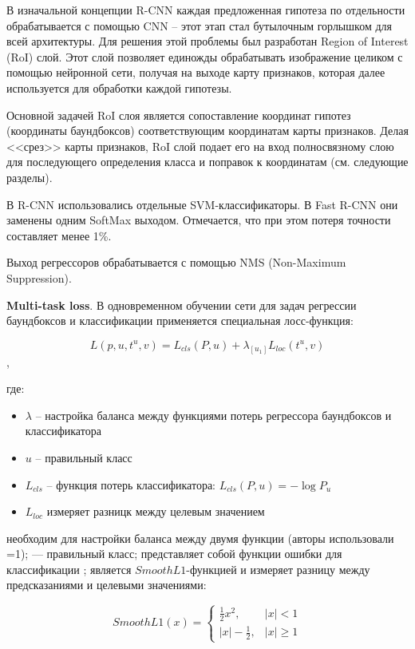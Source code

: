 В изначальной концепции R-CNN каждая предложенная гипотеза по отдельности обрабатывается с помощью CNN -- этот этап стал бутылочным горлышком для всей архитектуры. Для решения этой проблемы был разработан Region of Interest (RoI) слой. Этот слой позволяет единожды обрабатывать изображение целиком с помощью нейронной сети, получая на выходе карту признаков, которая далее используется для обработки каждой гипотезы.

Основной задачей RoI слоя является сопоставление координат гипотез (координаты баундбоксов) соответствующим координатам карты признаков. Делая <<срез>> карты признаков, RoI слой подает его на вход полносвязному слою для последующего определения класса и поправок к координатам (см. следующие разделы).

В R-CNN использовались отдельные SVM-классификаторы. В Fast R-CNN они заменены одним SoftMax выходом. Отмечается, что при этом потеря точности составляет менее 1\%.

Выход регрессоров обрабатывается с помощью NMS (Non-Maximum Suppression).

\textbf{Multi-task loss}. В одновременном обучении сети для задач регрессии баундбоксов и классификации применяется специальная лосс-функция:

\begin{equation}
	L(p, u, t^u, v) = L_{cls}(P, u) + \lambda_{[u_1]}L_{loc}(t^u, v)
\end{equation},

где:

\begin{itemize}
	\item $\lambda$ -- настройка баланса между функциями потерь регрессора баундбоксов и классификатора
	\item $u$ -- правильный класс
	\item $L_{cls}$ -- функция потерь классификатора: $L_{cls}(P, u) = -\log P_u$
	\item $L_{loc}$ измеряет разницк между целевым значением 
\end{itemize}

необходим для настройки баланса между двумя функции (авторы использовали =1);
— правильный класс;
представляет собой функции ошибки для классификации ;
является $SmoothL1$-функцией и измеряет разницу между предсказаниями и целевыми значениями:

\begin{equation}
	SmoothL1(x) = 
	\begin{cases}
		\frac{1}{2}x^2, & |x| < 1 \\
		|x| - \frac{1}{2}, & |x| \geq 1
	\end{cases}
\end{equation}


